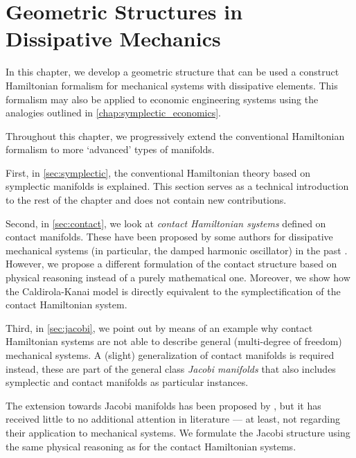 \chapter{Geometric Structures in Dissipative Mechanics}
\label{chap:geometric_structures}

In this chapter, we develop a geometric structure that can be used a construct Hamiltonian formalism for mechanical systems with dissipative elements. This formalism may also be applied to economic engineering systems using the analogies outlined in \cref{chap:symplectic_economics}.

Throughout this chapter, we progressively extend the conventional Hamiltonian formalism to more `advanced' types of manifolds.

First, in \cref{sec:symplectic}, the conventional Hamiltonian theory based on symplectic manifolds is explained. This section serves as a technical introduction to the rest of the chapter and does not contain new contributions.

Second, in \cref{sec:contact}, we look at \emph{contact Hamiltonian systems} defined on contact manifolds. These have been proposed by some authors for dissipative mechanical systems (in particular, the damped harmonic oscillator) in the past \cite{Bravetti2015}. However, we propose a different formulation of the contact structure based on physical reasoning instead of a purely mathematical one. Moreover, we show how the Caldirola-Kanai model is directly equivalent to the symplectification of the contact Hamiltonian system.

Third, in \cref{sec:jacobi}, we point out by means of an example why contact Hamiltonian systems are not able to describe general (multi-degree of freedom) mechanical systems. A (slight) generalization of contact manifolds is required instead, these are part of the general class \emph{Jacobi manifolds} that also includes symplectic and contact manifolds as particular instances. 

The extension towards Jacobi manifolds has been proposed by \citet{ciaglia2018}, but it has received little to no additional attention in literature --- at least, not regarding their application to mechanical systems. We formulate the Jacobi structure using the same physical reasoning as for the contact Hamiltonian systems.






